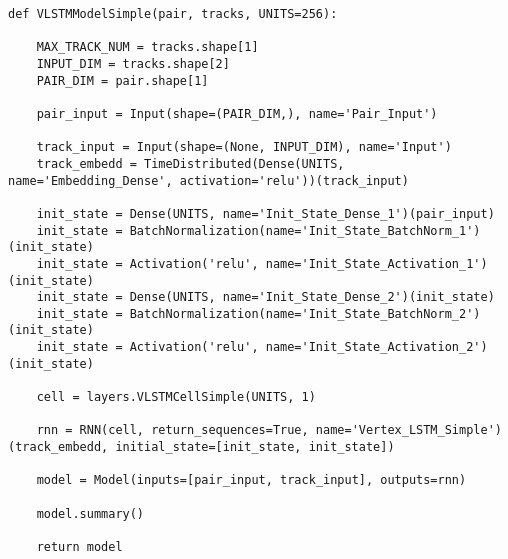 \begin{lstlisting}[caption=独自のLSTM, label=DedicatedLSTM]
def VLSTMModelSimple(pair, tracks, UNITS=256):

    MAX_TRACK_NUM = tracks.shape[1]
    INPUT_DIM = tracks.shape[2]
    PAIR_DIM = pair.shape[1]

    pair_input = Input(shape=(PAIR_DIM,), name='Pair_Input')

    track_input = Input(shape=(None, INPUT_DIM), name='Input')
    track_embedd = TimeDistributed(Dense(UNITS, name='Embedding_Dense', activation='relu'))(track_input)

    init_state = Dense(UNITS, name='Init_State_Dense_1')(pair_input)
    init_state = BatchNormalization(name='Init_State_BatchNorm_1')(init_state)
    init_state = Activation('relu', name='Init_State_Activation_1')(init_state)
    init_state = Dense(UNITS, name='Init_State_Dense_2')(init_state)
    init_state = BatchNormalization(name='Init_State_BatchNorm_2')(init_state)
    init_state = Activation('relu', name='Init_State_Activation_2')(init_state)

    cell = layers.VLSTMCellSimple(UNITS, 1)

    rnn = RNN(cell, return_sequences=True, name='Vertex_LSTM_Simple')(track_embedd, initial_state=[init_state, init_state])
    
    model = Model(inputs=[pair_input, track_input], outputs=rnn)

    model.summary()

    return model
\end{lstlisting}

